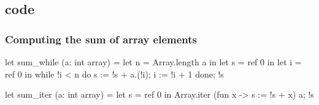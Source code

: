 \documentclass[xcolor=dvipsnames]{beamer}
\begin{document}
\subsection*{code}
\begin{frame}[fragile]\frametitle{Computing the sum of array elements}
\begin{adjustwidth}{-0.3cm}{1.0cm}
\begin{small}
\begin{minipage}[t]{0.4\textwidth}
\begin{whycode}  
let sum_while (a: int array)
= let n = Array.length a in
  let s = ref 0 in
  let i = ref 0 in
  while !i < n do
    s := !s + a.(!i);
    i := !i + 1
  done;
  !s
\end{whycode}
\end{minipage}\hfill
\begin{minipage}[t]{0.4\textwidth}
\begin{whycode} 
let sum_iter (a: int array)
= let s = ref 0 in
  Array.iter 
    (fun x -> s := !s + x) a;
  !s
\end{whycode}	
\end{minipage}
\end{small}
\end{adjustwidth}
\vspace*{4.7em}~
\end{frame}
\addtocounter{framenumber}{-1}
\end{document}
